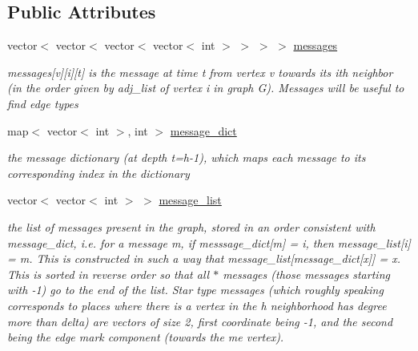 \subsection*{Public Attributes}
\begin{DoxyCompactItemize}
\item 
vector$<$ vector$<$ vector$<$ vector$<$ int $>$ $>$ $>$ $>$ \hyperlink{classgraph__message_a06a1d1ab91b4891c65ea80205566f800}{messages}
\begin{DoxyCompactList}\small\item\em messages\mbox{[}v\mbox{]}\mbox{[}i\mbox{]}\mbox{[}t\mbox{]} is the message at time t from vertex v towards its ith neighbor (in the order given by adj\+\_\+list of vertex i in graph G). Messages will be useful to find edge types \end{DoxyCompactList}\item 
map$<$ vector$<$ int $>$, int $>$ \hyperlink{classgraph__message_a7890d2dff06b9de6f98734c69d8fbcfd}{message\+\_\+dict}
\begin{DoxyCompactList}\small\item\em the message dictionary (at depth t=h-\/1), which maps each message to its corresponding index in the dictionary \end{DoxyCompactList}\item 
vector$<$ vector$<$ int $>$ $>$ \hyperlink{classgraph__message_aa497f561e976cf58cc554a77e0601d8f}{message\+\_\+list}
\begin{DoxyCompactList}\small\item\em the list of messages present in the graph, stored in an order consistent with message\+\_\+dict, i.\+e. for a message m, if messsage\+\_\+dict\mbox{[}m\mbox{]} = i, then message\+\_\+list\mbox{[}i\mbox{]} = m. This is constructed in such a way that message\+\_\+list\mbox{[}message\+\_\+dict\mbox{[}x\mbox{]}\mbox{]} = x. This is sorted in reverse order so that all $\ast$ messages (those messages starting with -\/1) go to the end of the list. Star type messages (which roughly speaking corresponds to places where there is a vertex in the h neighborhood has degree more than delta) are vectors of size 2, first coordinate being -\/1, and the second being the edge mark component (towards the \textquotesingle{}me\textquotesingle{} vertex). \end{DoxyCompactList}\end{DoxyCompactItemize}
